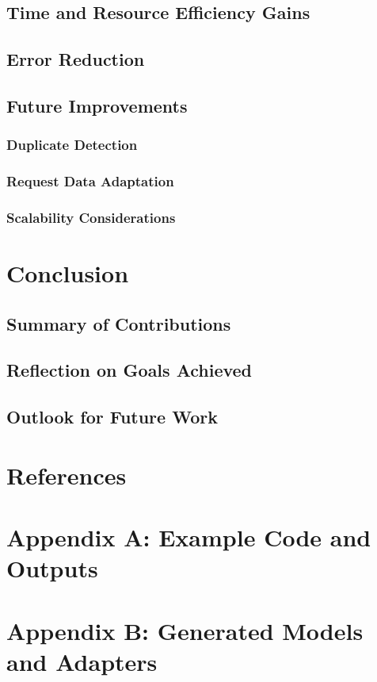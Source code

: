 \documentclass[12pt,a4paper]{article}
\begin{document}
  \subsection{Time and Resource Efficiency Gains}
  \subsection{Error Reduction}
  \subsection{Future Improvements}
    \subsubsection{Duplicate Detection}
    \subsubsection{Request Data Adaptation}
    \subsubsection{Scalability Considerations}

\section{Conclusion} %
  \subsection{Summary of Contributions}
  \subsection{Reflection on Goals Achieved}
  \subsection{Outlook for Future Work}

\section*{References}

\appendix
\section{Appendix A: Example Code and Outputs}
\section{Appendix B: Generated Models and Adapters}
\end{document}
